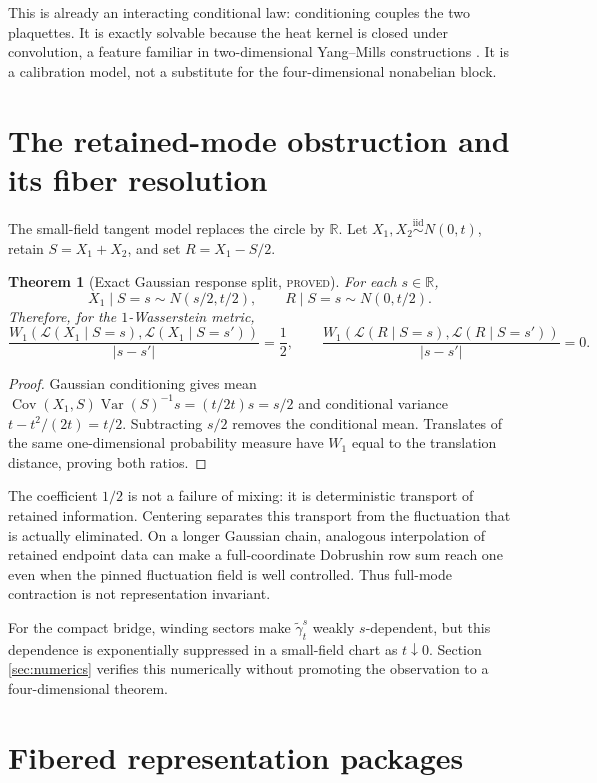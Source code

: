 \documentclass[11pt]{article}
\newcommand{\proved}{\textcolor{provedgreen}{\textsc{proved}}}
\newcommand{\Cov}{\operatorname{Cov}}
\newcommand{\R}{\mathbb R}
\newtheorem{theorem}[definition]{Theorem}
\theoremstyle{remark}
\begin{document}
This is already an interacting conditional law: conditioning couples the two
plaquettes.  It is exactly solvable because the heat kernel is closed under
convolution, a feature familiar in two-dimensional Yang--Mills constructions
\cite{driver2d}.  It is a calibration model, not a substitute for the
four-dimensional nonabelian block.

\section{The retained-mode obstruction and its fiber resolution}

The small-field tangent model replaces the circle by $\R$.  Let
$X_1,X_2\stackrel{\mathrm{iid}}\sim N(0,t)$, retain $S=X_1+X_2$, and set
$R=X_1-S/2$.

\begin{theorem}[Exact Gaussian response split, \proved]\label{thm:gaussian}
For each $s\in\R$,
\[
 X_1\mid S=s\sim N(s/2,t/2),
 \qquad R\mid S=s\sim N(0,t/2).
\]
Therefore, for the $1$-Wasserstein metric,
\[
 \frac{W_1(\mathcal L(X_1\mid S=s),\mathcal L(X_1\mid S=s'))}{|s-s'|}
 =\frac12,
 \qquad
 \frac{W_1(\mathcal L(R\mid S=s),\mathcal L(R\mid S=s'))}{|s-s'|}=0.
\]
\end{theorem}
\begin{proof}
Gaussian conditioning gives mean
$\Cov(X_1,S)\operatorname{Var}(S)^{-1}s=(t/2t)s=s/2$ and conditional variance
$t-t^2/(2t)=t/2$.  Subtracting $s/2$ removes the conditional mean.  Translates
of the same one-dimensional probability measure have $W_1$ equal to the
translation distance, proving both ratios.
\end{proof}

The coefficient $1/2$ is not a failure of mixing: it is deterministic transport
of retained information.  Centering separates this transport from the
fluctuation that is actually eliminated.  On a longer Gaussian chain, analogous
interpolation of retained endpoint data can make a full-coordinate Dobrushin
row sum reach one even when the pinned fluctuation field is well controlled.
Thus full-mode contraction is not representation invariant.

For the compact bridge, winding sectors make
$\widetilde\gamma_t^s$ weakly $s$-dependent, but this dependence is
exponentially suppressed in a small-field chart as $t\downarrow0$.  Section
\ref{sec:numerics} verifies this numerically without promoting the observation
to a four-dimensional theorem.

\section{Fibered representation packages}
\end{document}
